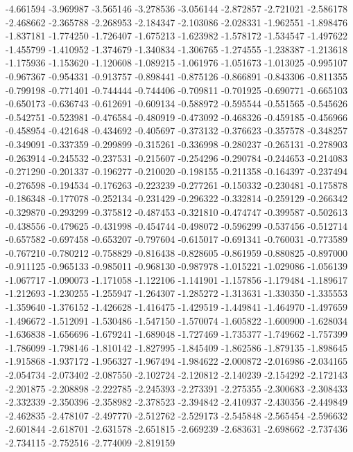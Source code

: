-4.661594
-3.969987
-3.565146
-3.278536
-3.056144
-2.872857
-2.721021
-2.586178
-2.468662
-2.365788
-2.268953
-2.184347
-2.103086
-2.028331
-1.962551
-1.898476
-1.837181
-1.774250
-1.726407
-1.675213
-1.623982
-1.578172
-1.534547
-1.497622
-1.455799
-1.410952
-1.374679
-1.340834
-1.306765
-1.274555
-1.238387
-1.213618
-1.175936
-1.153620
-1.120608
-1.089215
-1.061976
-1.051673
-1.013025
-0.995107
-0.967367
-0.954331
-0.913757
-0.898441
-0.875126
-0.866891
-0.843306
-0.811355
-0.799198
-0.771401
-0.744444
-0.744406
-0.709811
-0.701925
-0.690771
-0.665103
-0.650173
-0.636743
-0.612691
-0.609134
-0.588972
-0.595544
-0.551565
-0.545626
-0.542751
-0.523981
-0.476584
-0.480919
-0.473092
-0.468326
-0.459185
-0.456966
-0.458954
-0.421648
-0.434692
-0.405697
-0.373132
-0.376623
-0.357578
-0.348257
-0.349091
-0.337359
-0.299899
-0.315261
-0.336998
-0.280237
-0.265131
-0.278903
-0.263914
-0.245532
-0.237531
-0.215607
-0.254296
-0.290784
-0.244653
-0.214083
-0.271290
-0.201337
-0.196277
-0.210020
-0.198155
-0.211358
-0.164397
-0.237494
-0.276598
-0.194534
-0.176263
-0.223239
-0.277261
-0.150332
-0.230481
-0.175878
-0.186348
-0.177078
-0.252134
-0.231429
-0.296322
-0.332814
-0.259129
-0.266342
-0.329870
-0.293299
-0.375812
-0.487453
-0.321810
-0.474747
-0.399587
-0.502613
-0.438556
-0.479625
-0.431998
-0.454744
-0.498072
-0.596299
-0.537456
-0.512714
-0.657582
-0.697458
-0.653207
-0.797604
-0.615017
-0.691341
-0.760031
-0.773589
-0.767210
-0.780212
-0.758829
-0.816438
-0.828605
-0.861959
-0.880825
-0.897000
-0.911125
-0.965133
-0.985011
-0.968130
-0.987978
-1.015221
-1.029086
-1.056139
-1.067717
-1.090073
-1.171058
-1.122106
-1.141901
-1.157856
-1.179484
-1.189617
-1.212693
-1.230255
-1.255947
-1.264307
-1.285272
-1.313631
-1.330350
-1.335553
-1.359640
-1.376152
-1.426628
-1.416475
-1.429519
-1.449841
-1.464970
-1.497659
-1.496672
-1.512091
-1.530486
-1.547150
-1.570074
-1.605822
-1.600900
-1.628034
-1.636838
-1.656696
-1.679241
-1.689048
-1.727469
-1.735377
-1.749662
-1.757399
-1.786099
-1.798146
-1.810142
-1.827995
-1.845409
-1.862586
-1.879135
-1.898645
-1.915868
-1.937172
-1.956327
-1.967494
-1.984622
-2.000872
-2.016986
-2.034165
-2.054734
-2.073402
-2.087550
-2.102724
-2.120812
-2.140239
-2.154292
-2.172143
-2.201875
-2.208898
-2.222785
-2.245393
-2.273391
-2.275355
-2.300683
-2.308433
-2.332339
-2.350396
-2.358982
-2.378523
-2.394842
-2.410937
-2.430356
-2.449849
-2.462835
-2.478107
-2.497770
-2.512762
-2.529173
-2.545848
-2.565454
-2.596632
-2.601844
-2.618701
-2.631578
-2.651815
-2.669239
-2.683631
-2.698662
-2.737436
-2.734115
-2.752516
-2.774009
-2.819159
